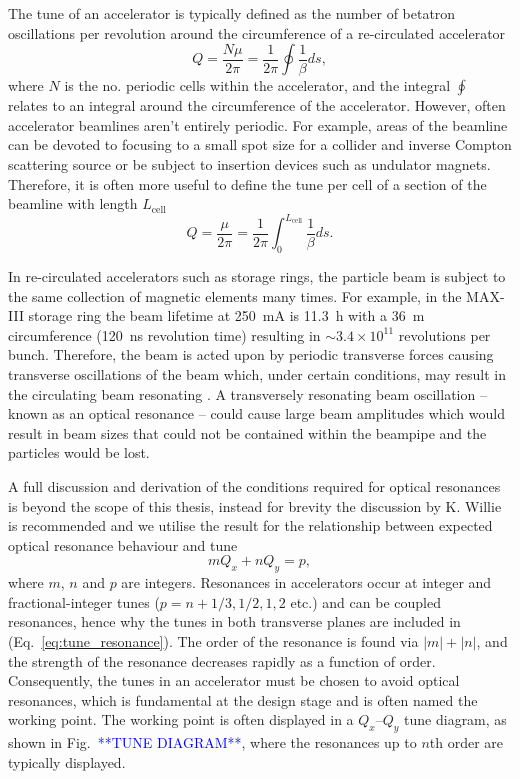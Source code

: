 \documentclass[../main.tex]{subfiles}
\begin{document}
The tune of an accelerator is typically defined as the number of betatron oscillations per revolution around the circumference of a re-circulated accelerator
\begin{equation}
Q=\frac{N\mu}{2\pi} = \frac{1}{2\pi}\oint\frac{1}{\beta}ds,
\label{eq:accelerator_tune}    
\end{equation}
where $N$ is the no. periodic cells within the accelerator, and the integral $\oint$ relates to an integral around the circumference of the accelerator. However, often accelerator beamlines aren't entirely periodic. For example, areas of the beamline can be devoted to focusing to a small spot size for a collider and inverse Compton scattering source or be subject to insertion devices such as undulator magnets. Therefore, it is often more useful to define the tune per cell of a section of the beamline with length $L_{\mathrm{cell}}$
\begin{equation}
Q=\frac{\mu}{2\pi} = \frac{1}{2\pi}\int_{0}^{L_{\mathrm{cell}}}\frac{1}{\beta}ds. 
\label{eq:tune_per_cell}    
\end{equation}

In re-circulated accelerators such as storage rings, the particle beam is subject to the same collection of magnetic elements many times. For example, in the MAX-III storage ring the beam lifetime at 250~\si{\milli\ampere} is 11.3~\si{\hour} with a 36~\si{\meter} circumference (120~\si{\nano\second} revolution time) resulting in $\sim3.4\times 10^{11}$ revolutions per bunch. Therefore, the beam is acted upon by periodic transverse forces causing transverse oscillations of the beam which, under certain conditions, may result in the circulating beam resonating \cite{wille2000physics}. A transversely resonating beam oscillation -- known as an optical resonance -- could cause large beam amplitudes which would result in beam sizes that could not be contained within the beampipe and the particles would be lost.

A full discussion and derivation of the conditions required for optical resonances is beyond the scope of this thesis, instead for brevity the discussion by K. Willie \cite{wille2000physics} is recommended and we utilise the result for the relationship between expected optical resonance behaviour and tune
\begin{equation}
mQ_{x}+nQ_{y} = p,
\label{eq:tune_resonances}    
\end{equation}
where $m$, $n$ and $p$ are integers. Resonances in accelerators occur at integer and fractional-integer tunes ($p = n + 1/3, 1/2, 1, 2$ etc.) and can be coupled resonances, hence why the tunes in both transverse planes are included in (Eq.~\ref{eq:tune_resonance}). The order of the resonance is found via $\left|m\right| + \left|n\right|$, and the strength of the resonance decreases rapidly as a function of order. Consequently, the tunes in an accelerator must be chosen to avoid optical resonances, which is fundamental at the design stage and is often named the working point. The working point is often displayed in a $Q_{x}$--$Q_{y}$ tune diagram, as shown in Fig.~\textcolor{blue}{**TUNE DIAGRAM**}, where the resonances up to $n$th order are typically displayed.  
\end{document}
